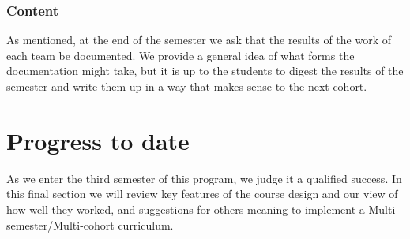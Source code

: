 \subsubsection{Content}As mentioned, at the end of the semester we ask that the results of the work of each team be documented. We provide a general idea of what forms the documentation might take, but it is up to the students to digest the results of the semester and write them up in a way that makes sense to the next cohort.


\section{Progress to date}
As we enter the third semester of this program, we judge it a qualified success. In this final section we will review key features of the course design and our view of how well they worked, and suggestions for others meaning to implement a Multi-semester/Multi-cohort curriculum.
